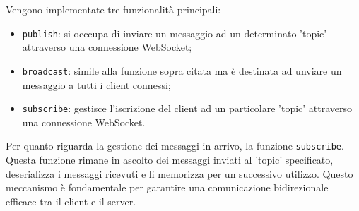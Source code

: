 Vengono implementate tre funzionalità principali:
\begin{itemize}
    \item \texttt{publish}: si occcupa di inviare un messaggio ad un determinato 'topic' attraverso una connessione WebSocket;
    \item \texttt{broadcast}: simile alla funzione sopra citata ma è destinata ad unviare un messaggio a tutti i client connessi;
    \item \texttt{subscribe}: gestisce l'iscrizione del client ad un particolare 'topic' attraverso una connessione WebSocket.
\end{itemize}

Per quanto riguarda la gestione dei messaggi in arrivo, la funzione \texttt{subscribe}.
Questa funzione rimane in ascolto dei messaggi inviati al 'topic' specificato, deserializza i messaggi ricevuti e li memorizza per un successivo utilizzo.
Questo meccanismo è fondamentale per garantire una comunicazione bidirezionale efficace tra il client e il server.

